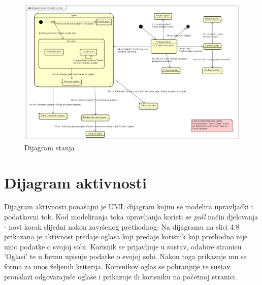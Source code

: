 		
		\begin{figure}[H]
			\includegraphics[scale=0.3]{dijagrami/dijagramStanja1} %
			\centering
			\caption{Dijagram stanja}
			\label{fig:dijagramStanja}
		\end{figure}
		
		
		\eject 
		
		\section{Dijagram aktivnosti}
		
		Dijagram aktivnosti ponašajni je UML dijagram kojim se modelira upravljački i podatkovni tok. Kod modeliranja toka upravljanja koristi se \textit{pull} način djelovanja - novi korak slijedni nakon završenog prethodnog. Na dijagramu na slici 4.8 prikazana je aktivnost predaje oglasa koji predaje korisnik koji prethodno nije unio podatke o svojoj sobi. Korisnik se prijavljuje u sustav, odabire stranicu 'Oglasi' te u formu upisuje podatke o svojoj sobi. Nakon toga prikazuje mu se forma za unos željenih kriterija. Korisnikov oglas se pohranjuje te sustav pronalazi odgovarajuće oglase i prikazuje ih korisniku na početnoj stranici.
		
